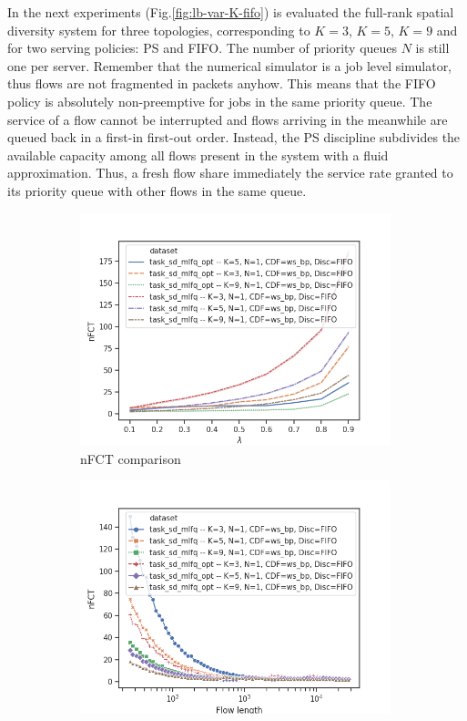 In the next experiments (Fig.\ref{fig:lb-var-K-fifo}) is evaluated the full-rank spatial diversity system for three topologies, corresponding to $K=3$, $K=5$, $K=9$ and for two serving policies: PS and FIFO. The number of priority queues $N$ is still one per server. Remember that the numerical simulator is a job level simulator, thus flows are not fragmented in packets anyhow. This means that the FIFO policy is absolutely non-preemptive for jobs in the same priority queue. The service of a flow cannot be interrupted and flows arriving in the meanwhile are queued back in a first-in first-out order. Instead, the PS discipline subdivides the available capacity among all flows present in the system with a fluid approximation. Thus, a fresh flow share immediately the service rate granted to its priority queue with other flows in the same queue. 
\begin{figure}
	\centering
	\begin{subfigure}{.5\textwidth}
		\centering
		\includegraphics[width=0.99\textwidth]{Chapter3/Figures/lb_opt_vs_nopt_comparison}
		\caption{nFCT comparison}
	\end{subfigure}%
	\hfill
	\begin{subfigure}{.5\textwidth}
		\centering
		\includegraphics[width=0.99\textwidth]{Chapter3/Figures/lb_opt_vs_nopt_detailed}

\end{subfigure}
\end{figure}
